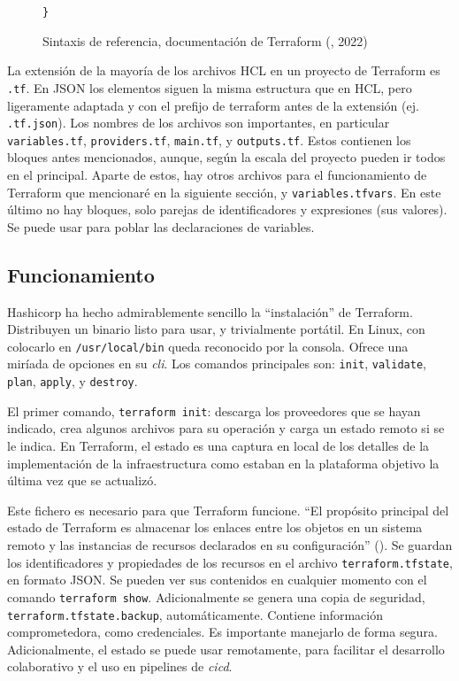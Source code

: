 \documentclass[11pt]{article}
\begin{document}
\begin{flushleft}
\begin{figure}[htb]
		\hspace{3.5cm}		
		\texttt{\}}
		\caption{Sintaxis de referencia, documentación de Terraform (\cite{hashicorp_lang1}, 2022)}
	\end{figure}
	

La extensión de la mayoría de los archivos HCL en un proyecto de Terraform es \texttt{.tf}. En JSON los elementos siguen la misma estructura que en HCL, pero ligeramente adaptada y con el prefijo de terraform antes de la extensión (ej. \texttt{.tf.json}). Los nombres de los archivos son importantes, en particular \texttt{variables.tf}, \texttt{providers.tf}, \texttt{main.tf}, y \texttt{outputs.tf}. Estos contienen los bloques antes mencionados, aunque, según la escala del proyecto pueden ir todos en el principal. Aparte de estos, hay otros archivos para el funcionamiento de Terraform que mencionaré en la siguiente sección, y \texttt{variables.tfvars}. En este último no hay bloques, solo parejas de identificadores y expresiones (sus valores). Se puede usar para poblar las declaraciones de variables.






	\clearpage
	\subsection{Funcionamiento}
		Hashicorp ha hecho admirablemente sencillo la ``instalación'' de Terraform. Distribuyen un binario listo para usar, y trivialmente portátil. En Linux, con colocarlo en \texttt{/usr/local/bin} queda reconocido por la consola. Ofrece una miríada de opciones en su \textit{\acrshort{cli}}. Los comandos principales son: \texttt{init}, \texttt{validate}, \texttt{plan}, \texttt{apply}, y \texttt{destroy}. 
		\linebreak
		
		El primer comando, \texttt{terraform init}: descarga los proveedores que se hayan indicado, crea algunos archivos para su operación y carga un estado remoto si se le indica. En Terraform, el estado es una captura en local de los detalles de la implementación de la infraestructura como estaban en la plataforma objetivo la última vez que se actualizó. 
		\linebreak
		
		Este fichero es necesario para que Terraform funcione. ``El propósito principal del estado de Terraform es almacenar los enlaces entre los objetos en un sistema remoto y las instancias de recursos declarados en su configuración'' (\cite{hashicorp_state}). Se guardan los identificadores y propiedades de los recursos en el archivo \texttt{terraform.tfstate}, en formato JSON. Se pueden ver sus contenidos en cualquier momento con el comando \texttt{terraform show}. Adicionalmente se genera una copia de seguridad, \texttt{terraform.tfstate.backup}, automáticamente. Contiene información comprometedora, como credenciales. Es importante manejarlo de forma segura. Adicionalmente, el estado se puede usar remotamente, para facilitar el desarrollo colaborativo y el uso en pipelines de \textit{\acrshort{cicd}}. 
		\linebreak
		

\end{flushleft}
\end{document}
